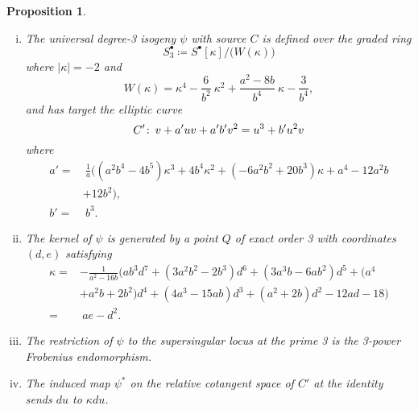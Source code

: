 \documentclass{gtpart}
\newtheorem{prop}[thm]{Proposition}
\theoremstyle{definition}
\theoremstyle{remark}
\def\co{\colon\thinspace}
\newcommand{\K}{\kappa}
\newcommand{\s}{S^\bullet}
\newcommand{\ce}{\coloneqq}
\numberwithin{equation}{section}
\numberwithin{thm}{section}
\begin{document}
\begin{prop}
\label{prop:isog}
 \mbox{}
 \begin{enumerate}[(i)]
  \item \label{isog(i)} The universal degree-3 isogeny $\psi$ with 
  source $C$ is defined over the graded ring 
  \[
   \s_3 \ce \s [\K] \big/ \big( W(\K) \big) 
  \]
  where $|\K| = -2$ and 
  \begin{equation}
  \label{W}
   W(\K) = \K^4 - \frac{6}{b^2} ~ \K^2 + \frac{a^2 - 8 b}{b^4} ~ \K 
   - \frac{3}{b^4}, 
  \end{equation}
  and has target the elliptic curve 
  \[
   C' \co v + a' u v + a' b' v^2 = u^3 + b' u^2 v 
  \]
  where 
  \begin{equation}
  \label{a'b'K}
  \begin{split}
   a' = & ~ \frac{1}{a} \big( (a^2 b^4 - 4 b^5) \K^3 + 4 b^4 \K^2 + (-6 a^2 b^2 + 20 b^3) \K + a^4 - 12 a^2 b \\
        & + 12 b^2 \big), \\
   b' = & ~ b^3.  
  \end{split}
  \end{equation}

  \item \label{isog(ii)} The kernel of $\psi$ is generated by a point 
  $Q$ of exact order 3 with coordinates $(d,e)$ satisfying 
  \begin{equation}
  \label{K}
  \begin{split}
   \K = & -\frac{1}{a^2 - 16 b} \big( a b^3 d^7 + (3 a^2 b^2 - 2 b^3) d^6 + (3 a^3 b - 6 a b^2) d^5 + (a^4 \\
        & + a^2 b + 2 b^2) d^4 + (4 a^3 - 15 a b) d^3 + (a^2 + 2 b) d^2 - 12 a d - 18 \big) \\
      = & ~ a e - d^2.  
  \end{split}
  \end{equation}

  \item \label{isog(iii)} The restriction of $\psi$ to the supersingular 
  locus at the prime 3 is the 3-power Frobenius endomorphism.  

  \item \label{isog(iv)} The induced map $\psi^*$ on the relative 
  cotangent space of $C'$ at the identity sends $du$ to $\K du$.  
 \end{enumerate}
\end{prop}
\end{document}
